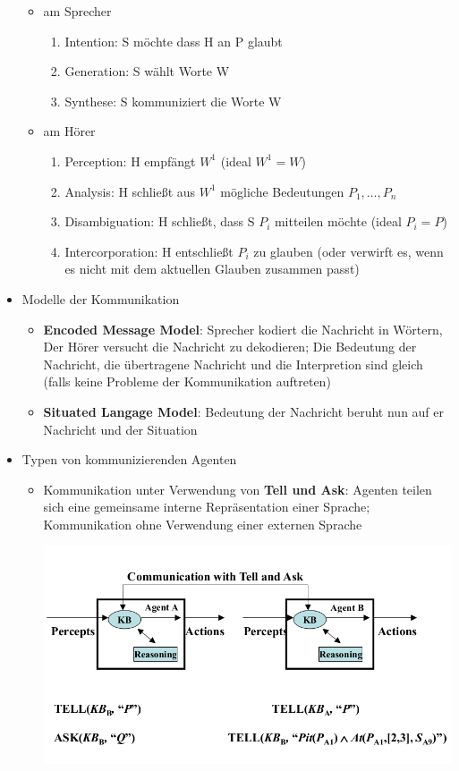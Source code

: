 \documentclass{article} %
\begin{document}
\begin{itemize}
		\begin{itemize}
			\item am Sprecher
			\begin{enumerate}
				\item Intention: S möchte dass H an P glaubt
				\item Generation: S wählt Worte W
				\item Synthese: S kommuniziert die Worte W
			\end{enumerate}
			\item am Hörer
			\begin{enumerate}
				\item Perception: H empfängt $W^1$ (ideal $W^1 = W$)
				\item Analysis: H schließt aus $W^1$ mögliche Bedeutungen $P_1,\dots,P_n$
				\item Disambiguation: H schließt, dass S $P_i$ mitteilen möchte (ideal $P_i = P$)
				\item Intercorporation: H entschließt $P_i$ zu glauben (oder verwirft es, wenn es nicht mit dem aktuellen Glauben zusammen passt)
			\end{enumerate}
		\end{itemize}
		\item Modelle der Kommunikation
		\begin{itemize}
			\item \textbf{Encoded Message Model}: Sprecher kodiert die Nachricht in Wörtern, Der Hörer versucht die Nachricht zu dekodieren; Die Bedeutung der Nachricht, die übertragene Nachricht und die Interpretion sind gleich (falls keine Probleme der Kommunikation auftreten)
			\item \textbf{Situated Langage Model}: Bedeutung der Nachricht beruht nun auf er Nachricht und der Situation
		\end{itemize}
		\item Typen von kommunizierenden Agenten
		\begin{itemize}
			\item Kommunikation unter Verwendung von \textbf{Tell und Ask}: Agenten teilen sich eine gemeinsame interne Repräsentation einer Sprache; Kommunikation ohne Verwendung einer externen Sprache
			\begin{center}
				\includegraphics[scale=0.3]{img/tell and ask.png}

\end{center}
\end{itemize}
\end{itemize}
\end{document}
